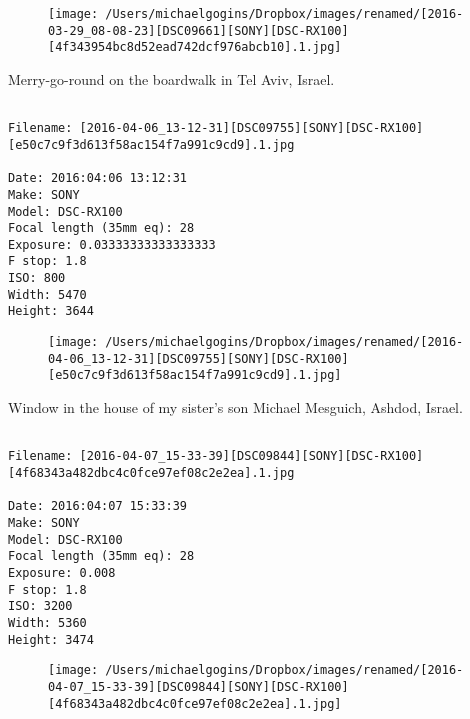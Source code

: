 \documentclass[11pt,letter,DIV=14,paper=landscape]{scrbook}
\begin{document}
\begin{figure}
\texttt{[image: /Users/michaelgogins/Dropbox/images/renamed/[2016-03-29\_08-08-23][DSC09661][SONY][DSC-RX100][4f343954bc8d52ead742dcf976abcb10].1.jpg]}
\end{figure}
    
\clearpage
\noindent Merry-go-round on the boardwalk in Tel Aviv, Israel.
\noindent
\begin{lstlisting}

Filename: [2016-04-06_13-12-31][DSC09755][SONY][DSC-RX100][e50c7c9f3d613f58ac154f7a991c9cd9].1.jpg

Date: 2016:04:06 13:12:31
Make: SONY
Model: DSC-RX100
Focal length (35mm eq): 28
Exposure: 0.03333333333333333
F stop: 1.8
ISO: 800
Width: 5470
Height: 3644
\end{lstlisting}
\clearpage

\begin{figure}
\texttt{[image: /Users/michaelgogins/Dropbox/images/renamed/[2016-04-06\_13-12-31][DSC09755][SONY][DSC-RX100][e50c7c9f3d613f58ac154f7a991c9cd9].1.jpg]}
\end{figure}
    
\clearpage
\noindent Window in the house of my sister's son Michael Mesguich, Ashdod, Israel.
\noindent
\begin{lstlisting}

Filename: [2016-04-07_15-33-39][DSC09844][SONY][DSC-RX100][4f68343a482dbc4c0fce97ef08c2e2ea].1.jpg

Date: 2016:04:07 15:33:39
Make: SONY
Model: DSC-RX100
Focal length (35mm eq): 28
Exposure: 0.008
F stop: 1.8
ISO: 3200
Width: 5360
Height: 3474
\end{lstlisting}
\clearpage

\begin{figure}
\texttt{[image: /Users/michaelgogins/Dropbox/images/renamed/[2016-04-07\_15-33-39][DSC09844][SONY][DSC-RX100][4f68343a482dbc4c0fce97ef08c2e2ea].1.jpg]}
\end{figure}
    
\end{document}
